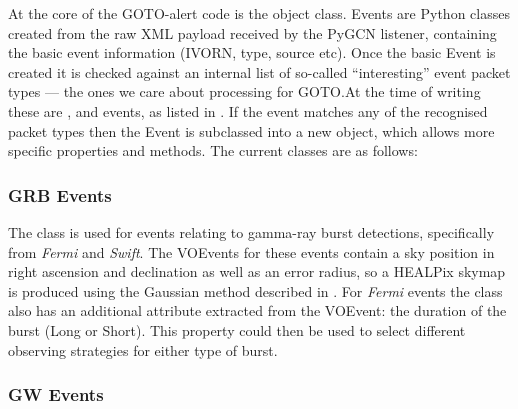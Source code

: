 \begin{colsection}
\begin{colsection}
At the core of the GOTO-alert code is the  object class. Events are Python classes created from the raw XML payload received by the PyGCN listener, containing the basic event information (IVORN, type, source etc). Once the basic Event is created it is checked against an internal list of so-called ``interesting'' event packet types --- the ones we care about processing for GOTO.\@ At the time of writing these are ,  and  events, as listed in . If the event matches any of the recognised packet types then the Event is subclassed into a new object, which allows more specific properties and methods. The current classes are as follows:

\subsubsection{GRB Events}

The  class is used for events relating to gamma-ray burst detections, specifically from \textit{Fermi} and \textit{Swift}. The VOEvents for these events contain a sky position in right ascension and declination as well as an error radius, so a HEALPix skymap is produced using the Gaussian method described in . For \textit{Fermi} events the class also has an additional attribute extracted from the VOEvent: the duration of the burst (Long or Short). This property could then be used to select different observing strategies for either type of burst.

\subsubsection{GW Events}


\end{colsection}
\end{colsection}

